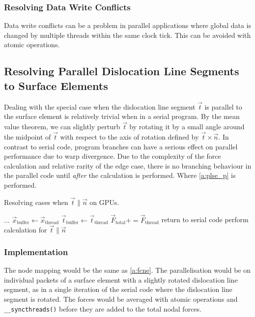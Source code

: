 \subsubsection{Resolving Data Write Conflicts}
Data write conflicts can be a problem in parallel applications where global data is changed by multiple threads within the same clock tick. This can be avoided with atomic operations.
%
\subsection[Parallel Dislocation Line Segments to Surface Elements]{Resolving Parallel Dislocation Line Segments to Surface Elements}
%
Dealing with the special case when the dislocation line segment $ \vec{t} $ is parallel to the surface element is relatively trivial when in a serial program. By the mean value theorem, we can slightly perturb $ \vec{t} $ by rotating it by a small angle around the midpoint of $ \vec{t} $ with respect to the axis of rotation defined by $ \vec{t} \times \vec{n} $. In contrast to serial code, program branches can have a serious effect on parallel performance due to warp divergence. Due to the complexity of the force calculation and relative rarity of the edge case, there is no branching behaviour in the parallel code until \emph{after} the calculation is performed. Where \cref{a:plse_p} is performed.
\begin{algorithm}
	\caption{Resolving cases when $ \vec{t} \parallel \vec{n} $ on GPUs.}
	\label{a:plse_p}
	\begin{algorithmic}
		\State $ \ldots $
		\State $ \vec{x}_{\textrm{buffer}} \gets \vec{x}_{\textrm{thread}} $
		\State $ \vec{t}_{\textrm{buffer}} \gets \vec{t}_{\textrm{thread}} $
		\Else
		\State $ \vec{F}_{\textrm{total}} += \vec{F}_{\textrm{thread}} $
		\EndIf
		\EndFor
		\State return to serial code
		\State perform calculation for $ \vec{t} \parallel \vec{n} $
		\EndFor
		\EndIf
	\end{algorithmic}
\end{algorithm}
\subsubsection{Implementation}
The node mapping would be the same as \cref{a:fcne}. The parallelisation would be on individual packets of a surface element with a slightly rotated dislocation line segment, as in a single iteration of the serial code where the dislocation line segment is rotated. The forces would be averaged with atomic operations and \texttt{__syncthreads()} before they are added to the total nodal forces.

